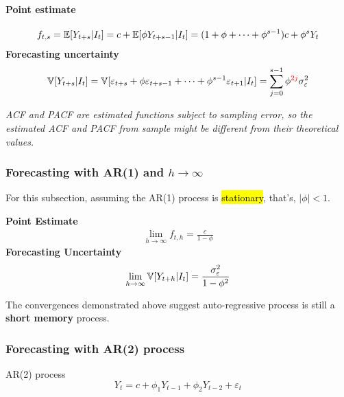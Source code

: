 \documentclass[11pt]{article}
\begin{document}
			\paragraph{Point estimate}
				\begin{gather}
					f_{t,s} = \mathbb{E}[{Y_{t+s}|I_t}]
					= c + \mathbb{E}[{\phi Y_{t+s-1}|I_t}]
					= (1 + \phi + \dots + \phi^{s-1}) c + \phi^s Y_t
				\end{gather}
			\textbf{Forecasting uncertainty}
				\begin{gather}
					\mathbb{V}[{Y_{t+s}|I_t}] = \mathbb{V}[{\varepsilon_{t+s} + \phi \varepsilon_{t+s-1} + \dots + \phi^{s-1} \varepsilon_{t+1} | I_t}]
					= \sum_{j=0}^{s-1} \phi^{\textcolor{red}{2j}} \sigma_\varepsilon^2
				\end{gather}
			\begin{remark}
				\emph{ACF and PACF are estimated functions subject to sampling error, so the estimated ACF and PACF from sample might be different from their theoretical values.}
			\end{remark}
		\subsubsection{Forecasting with AR(1) and $h \to \infty$}
			\begin{assumption}
				For this subsection, assuming the AR(1) process is \hl{stationary}, that's, $|\phi| < 1$.
			\end{assumption}
			\textbf{Point Estimate}
				\begin{gather}
					\lim_{h \to \infty} f_{t, h} = \frac{c}{1 - \phi}
				\end{gather}
			\textbf{Forecasting Uncertainty}
				\begin{gather}
					\lim_{h \to \infty} \mathbb{V}[{Y_{t+h}|I_t}] = \frac{\sigma_\varepsilon^2}{1 - \phi^2}
				\end{gather}
			\begin{remark}
				The convergences demonstrated above suggest auto-regressive process is still a \textbf{short memory} process.
			\end{remark}
			
		\subsubsection{Forecasting with AR(2) process}
			\begin{definition}
				AR(2) process
				\begin{equation}
					Y_t = c + \phi_1 Y_{t-1} + \phi_2 Y_{t-2} + \varepsilon_t
				\end{equation}
			\end{definition}
\end{document}

